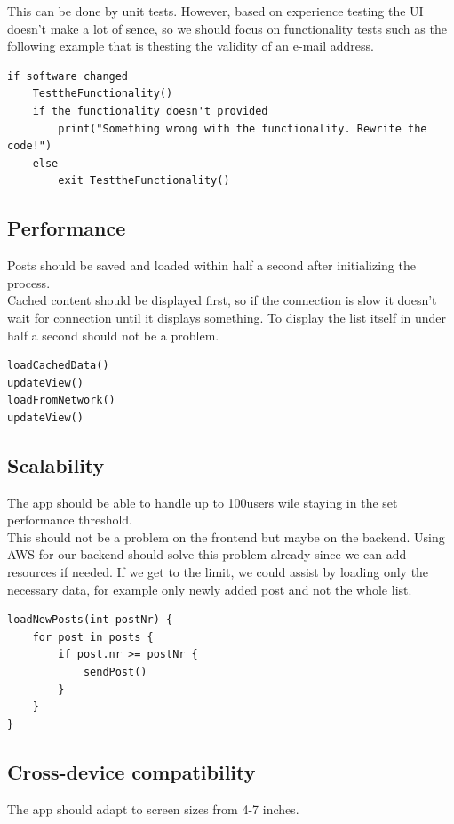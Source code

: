 \documentclass[conference]{IEEEtran}
\numberwithin{figure}{subsection}
\begin{document}
This can be done by unit tests. However, based on experience testing the UI doesn't make a lot of sence, so we should focus on functionality tests such as the following example that is thesting the validity of an e-mail address.

\begin{lstlisting}
if software changed
	TesttheFunctionality()
	if the functionality doesn't provided
		print("Something wrong with the functionality. Rewrite the code!")
	else
		exit TesttheFunctionality()
\end{lstlisting}



\subsection{Performance}
Posts  should  be  saved  and  loaded  within half a second after initializing the process.\\

Cached content should be displayed first, so if the connection is slow it doesn't wait for connection until it displays something. To display the list itself in under half a second should not be a problem.

\begin{lstlisting}
loadCachedData()
updateView()
loadFromNetwork()
updateView()
\end{lstlisting}


\subsection{Scalability}
The app should be able to handle up to 100users wile staying in the set performance threshold.\\

This should not be a problem on the frontend but maybe on the backend. Using AWS for our backend should solve this problem already since we can add resources if needed. If we get to the limit, we could assist by loading only the necessary data, for example only newly added post and not the whole list.

\begin{lstlisting}
loadNewPosts(int postNr) {
    for post in posts {
        if post.nr >= postNr {
            sendPost()
        }
    }
}
\end{lstlisting}


\subsection{Cross-device compatibility}
The  app  should  adapt  to  screen  sizes from 4-7 inches.\\
\end{document}
